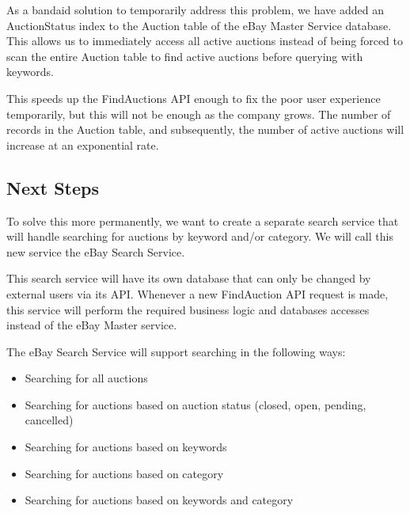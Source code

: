 \documentclass[12pt,a4paper]{article}
\begin{document}
As a bandaid solution to temporarily address this problem, we have added an 
AuctionStatus index to the Auction table of the eBay Master Service database.
This allows us to immediately access all active auctions instead of being forced 
to scan the entire Auction table to find active auctions before querying with keywords. 

\vspace{\baselineskip}
This speeds up the FindAuctions API enough to fix the poor user experience
temporarily, but this will not be enough as the company grows. The number of
records in the Auction table, and subsequently, the number of active auctions
will increase at an exponential rate.

\subsection{Next Steps}
To solve this more permanently, we want to create a separate search service
that will handle searching for auctions by keyword and/or category. 
We will call this new service the eBay Search Service.

\vspace{\baselineskip}
This search service will have its own database that can only be changed
by external users via its API. Whenever a new FindAuction API request is made, 
this service will perform the required business logic and databases accesses 
instead of the eBay Master service.

The eBay Search Service  will support searching in the following ways:

\begin{itemize}
\item Searching for all auctions
\item Searching for auctions based on auction status (closed, open, pending, cancelled)
\item Searching for auctions based on keywords
\item Searching for auctions based on category
\item Searching for auctions based on keywords and category
\end{itemize}

\pagebreak
\end{document}
